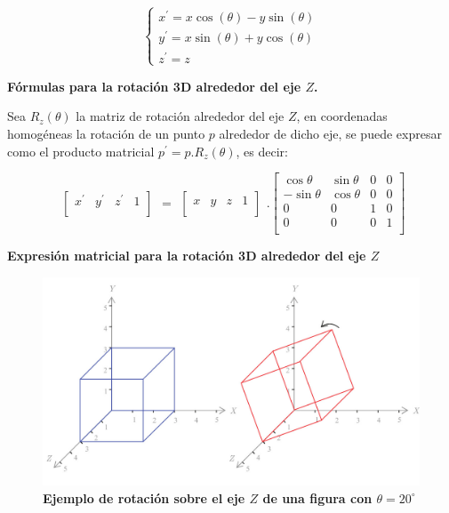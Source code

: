 \begin{equation}\label{eq:giro2d}
\begin{cases}
{x}^{\prime} = x \cos(\theta) -y \sin(\theta) \\ 
{y}^{\prime} = x \sin(\theta) +y \cos(\theta) \\
{z}^{\prime} = z
\end{cases}
\end{equation}

\begin{center}
\textbf{\footnotesize{Fórmulas para la rotación 3D alrededor del eje $Z$.}}
\end{center}

Sea $R_{z}(\theta)$ la matriz de rotación alrededor del eje $Z$, en coordenadas homogéneas la rotación de un punto $p$ alrededor de dicho eje, se puede expresar como el producto matricial
$p^{\prime} = p.R_{z}(\theta)$, es decir:



\begin{equation}
\begin{array}{rccl}
\left[
\begin{array}{rccl}
{x}^{\prime} & {y}^{\prime} & {z}^{\prime} & 1\\
\end{array}
\right]
\end{array}
=
\begin{array}{rccl}
\left[
\begin{array}{rccl}
x & y & z & 1\\
\end{array}
\right]
\end{array} 
.
\left[
\begin{array}{rccl}
\cos\theta & \sin\theta & 0 & 0\\
-\sin\theta & \cos\theta & 0 & 0\\
0 & 0 & 1 & 0\\
0 & 0 & 0 & 1\\
\end{array}
\right]
\end{equation}

\begin{center}
\textbf{\footnotesize{Expresión matricial para la rotación 3D alrededor del eje $Z$}}
\end{center}

\begin{figure}[h]
\includegraphics[width=12cm]{Img/GEO/geo-rotacion3d0.jpg}
\centering
    \caption{\footnotesize{\textbf{Ejemplo de rotación sobre el eje $Z$ de una figura con $\theta = 20^{\circ}$}}}
\end{figure}

